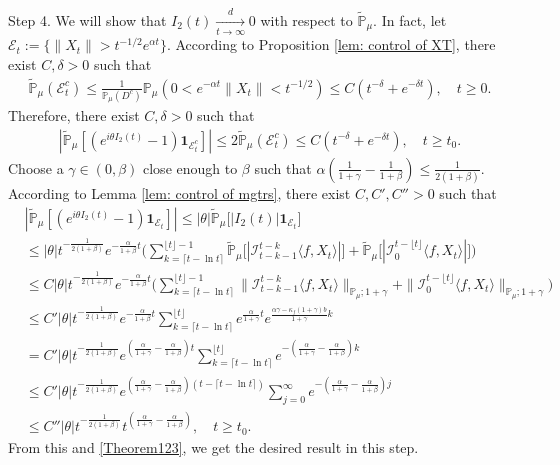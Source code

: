 \documentclass[12pt,a4paper]{amsart}
\theoremstyle{plain}
\theoremstyle{definition}
\numberwithin{equation}{section}
\begin{document}
    Step 4. We will show that $I_2(t) \xrightarrow[t\to \infty]{d} 0$ with respect to $\mathbb{\tilde{P}}_{\mu}$.
    In fact, let $\mathcal{E}_t:=\{\|X_t\|>t^{-1/2}e^{\alpha t}\}$. According to Proposition \ref{lem: control of XT}, there exist $C, \delta>0$ such that
\begin{equation}\begin{split}
    \mathbb{\tilde{P}}_{\mu}(\mathcal{E}^c_t)\leq \frac{1}{\mathbb{P}_{\mu}(D^c)}\mathbb{P}_{\mu}(0<e^{-\alpha t}\|X_t\|<t^{-1/2})\leq C( t^{-\delta}+e^{-\delta t}), \quad t\geq0.
\end{split}\end{equation}
    Therefore, there exist $C, \delta>0$ such that
\begin{equation}\begin{split}\label{Theorem123}
    |\mathbb{\tilde{P}}_{\mu}[(e^{i\theta I_2(t)}-1)\mathbf{1}_{\mathcal{E}^c_t}]|
    \leq 2\mathbb{\tilde{P}}_{\mu}(\mathcal{E}^c_t)\leq C(t^{-\delta}+e^{-\delta t}),
    \quad t\geq t_0.
\end{split}\end{equation}
    Choose a $\gamma\in (0,\beta)$ close enough to $\beta$ such that $\alpha(\frac{1}{1+\gamma}-\frac{1}{1+\beta})\leq \frac{1}{2(1+\beta)}$.
	According to Lemma \ref{lem: control of mgtrs}, there exist $C,C',C''>0$ such that
\begin{align*}
    &|\mathbb{\tilde{P}}_{\mu} [ (e^{i\theta I_2(t)}-1)\mathbf{1}_{\mathcal{E}_t}]|
    \leq |\theta| \mathbb{\tilde{P}}_{\mu} \big[ |I_2(t)|\mathbf{1}_{\mathcal{E}_t}\big]
    \\&\leq|\theta| t^{-\frac{1}{2(1+\beta)}}e^{-\frac{\alpha}{1+\beta}t}\Big(\sum_{k=\lceil t-\ln t \rceil}^{\lfloor t \rfloor - 1}\mathbb{\tilde{P}}_{\mu}\big[| \mathcal{I}_{t-k-1}^{t-k}\langle f,X_t\rangle|\big] + \mathbb{\tilde{P}}_{\mu}\big[| \mathcal{I}_{0}^{t-\lfloor t\rfloor}\langle f,X_t\rangle|\big]\Big)
    \\& \leq C |\theta| t^{-\frac{1}{2(1+\beta)}}e^{-\frac{\alpha}{1+\beta}t}\Big(\sum_{k=\lceil t-\ln t \rceil}^{\lfloor t \rfloor - 1}\|\mathcal{I}_{t-k-1}^{t-k}\langle f,X_t\rangle\|_{\mathbb P_\mu; 1+\gamma} + \|\mathcal I_0^{t-\lfloor t \rfloor} \langle f, X_t\rangle\|_{\mathbb P_\mu;1+\gamma}\Big)
    \\ &\leq C' |\theta| t^{-\frac{1}{2(1+\beta)}}e^{-\frac{\alpha}{1+\beta}t}\sum_{k=\lceil t-\ln t \rceil}^{\lfloor t \rfloor}e^{\frac{\alpha}{1+\gamma}t}e^{\frac{\alpha\gamma-\kappa_f(1+\gamma)b}{1+\gamma}k}\\
    &= C' |\theta| t^{-\frac{1}{2(1+\beta)}}e^{(\frac{\alpha }{1+\gamma}-\frac{\alpha }{1+\beta})t} \sum_{k=\lceil t-\ln t \rceil}^{\lfloor t \rfloor}e^{-(\frac{\alpha}{1+\gamma}-\frac{\alpha}{1+\beta})k}\\
    &\leq C' |\theta| t^{-\frac{1}{2(1+\beta)}}e^{(\frac{\alpha }{1+\gamma}-\frac{\alpha }{1+\beta})(t - \lceil t - \ln t\rceil)} \sum_{j=0}^{\infty}e^{-(\frac{\alpha}{1+\gamma}-\frac{\alpha}{1+\beta})j}\\
    &\leq C''|\theta| t^{-\frac{1}{2(1+\beta)}}t^{(\frac{\alpha}{1+\gamma}- \frac{\alpha}{1+\beta})},
    \quad t\geq t_0.
\end{align*}
	From this and \eqref{Theorem123}, we get the desired result in this step.
\end{document}
